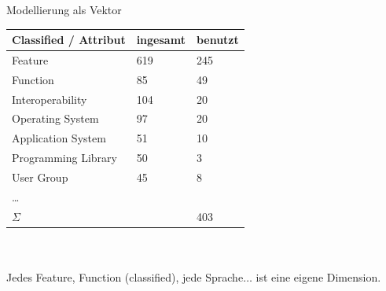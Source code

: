 \documentclass[aspectratio=1610]{beamer}%
\begin{document}

\begin{frame}{Modellierung als Vektor}
\begin{tabular}{lll}
\toprule
Classified / Attribut		&ingesamt	&benutzt\\
\midrule
Feature						&619		&245\\
Function					&85			&49\\	
Interoperability			&104		&20\\
Operating System			&97			&20\\
Application System			&51			&10\\
Programming Library			&50			&3\\
User Group					&45			&8\\
\ldots\\
\midrule
$\Sigma$					&			&403\\
\bottomrule
\end{tabular}
~\\~\\
Jedes Feature, Function (classified), jede Sprache$\ldots$ ist eine eigene Dimension.\\
\end{frame}
\end{document}
